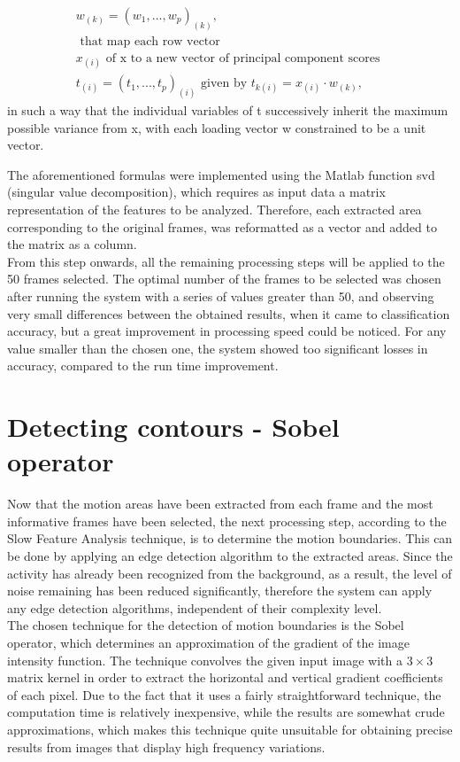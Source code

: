 \documentclass[11pt]{report}
\begin{document}
\begin{equation}
\begin{multlined}
w_{(k)} = (w_1, ..., w_p)_{(k)}, \\
\text{ that map each row vector } \\ x_{(i)} \text{ of x to a new vector of principal component scores } \\
t_{(i)} = (t_1, ..., t_p)_{(i)} \text{ given by } t_{k(i)} = x_{(i)} \cdot w_{(k)},
\end{multlined}
\end{equation}
 in such a way that the individual variables of t  successively inherit the maximum possible variance from x, with each loading vector w constrained to be a unit vector.


The aforementioned formulas were implemented using the Matlab function svd (singular value decomposition), which requires as input data a matrix representation of the features to be analyzed. Therefore, each extracted area corresponding to the original frames, was reformatted as a vector and added to the matrix as a column. \\


From this step onwards, all the remaining processing steps will be applied to the 50 frames selected. The optimal number of the frames to be selected was chosen after running the system with a series of values greater than 50, and observing very small differences between the obtained results, when it came to classification accuracy, but a great improvement in processing speed could be noticed. For any value smaller than the chosen one, the system showed too significant losses in accuracy, compared to the run time improvement.\\

\section{Detecting contours - Sobel operator}
Now that the motion areas have been extracted from each frame and the most informative frames have been selected, the next processing step, according to the Slow Feature Analysis technique, is to determine the motion boundaries. This can be done by applying an edge detection algorithm to the extracted areas. Since the activity has already been recognized from the background, as a result, the level of noise remaining has been reduced significantly, therefore the system can apply any edge detection algorithms, independent of their complexity level. \\
The chosen technique for the detection of motion boundaries is the Sobel operator, which determines an approximation of the gradient of the image intensity function. The technique convolves the given input image with a \(3 \times 3\) matrix kernel in order to extract the horizontal and vertical gradient coefficients of each pixel. Due to the fact that it uses a fairly straightforward technique, the computation time is relatively inexpensive, while the results are somewhat crude approximations, which makes this technique quite unsuitable for obtaining precise results from images that display high frequency variations. \\
\end{document}
